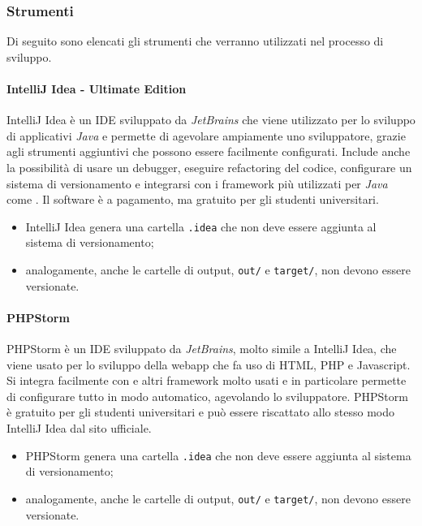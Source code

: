 		\subsubsection{Strumenti}
			Di seguito sono elencati gli strumenti che verranno utilizzati nel processo di sviluppo.
							
				\paragraph{IntelliJ Idea - Ultimate Edition}
					IntelliJ Idea è un IDE sviluppato da \textit{JetBrains} che viene utilizzato per lo sviluppo di applicativi \textit{Java} e permette di agevolare ampiamente uno sviluppatore, grazie agli strumenti aggiuntivi che possono essere facilmente configurati. Include anche la possibilità di usare un debugger, eseguire refactoring del codice, configurare un sistema di versionamento e integrarsi con i framework più utilizzati per \textit{Java} come . Il software è a pagamento, ma gratuito per gli studenti universitari. 

					\begin{itemize}
						\item IntelliJ Idea genera una cartella \verb!.idea! che non deve essere aggiunta al sistema di versionamento;
						\item analogamente, anche le cartelle di output, \verb!out/! e \verb!target/!, non devono essere versionate.
					\end{itemize}

				\paragraph{PHPStorm}
					PHPStorm è un IDE sviluppato da \textit{JetBrains}, molto simile a IntelliJ Idea, che viene usato per lo sviluppo della webapp che fa uso di HTML, PHP e Javascript. Si integra facilmente con  e altri framework molto usati e in particolare permette di configurare tutto in modo automatico, agevolando lo sviluppatore. PHPStorm è gratuito per gli studenti universitari e può essere riscattato allo stesso modo IntelliJ Idea dal sito ufficiale. 

					\begin{itemize}
						\item PHPStorm genera una cartella \verb!.idea! che non deve essere aggiunta al sistema di versionamento;
						\item analogamente, anche le cartelle di output, \verb!out/! e \verb!target/!, non devono essere versionate.
					\end{itemize}

